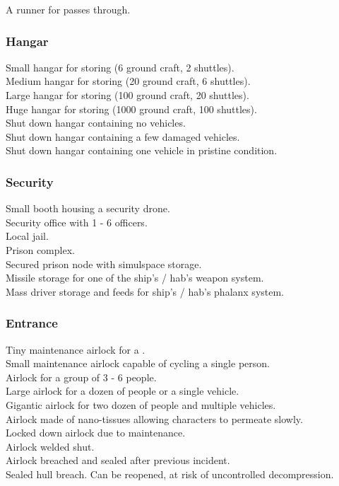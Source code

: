 \documentclass[a4]{article}
\begin{document}
\starttableone
A runner for  passes through.\\
\stoptableone


\subsubsection{Hangar}

\starttableone
Small hangar for storing (6 ground craft, 2 shuttles).\\
Medium hangar for storing (20 ground craft, 6 shuttles).\\
Large hangar for storing (100 ground craft, 20 shuttles).\\
Huge hangar for storing (1000 ground craft, 100 shuttles).\\
Shut down hangar containing no vehicles.\\
Shut down hangar containing a few damaged vehicles.\\
Shut down hangar containing one vehicle in pristine condition.\\
\stoptableone


\subsubsection{Security}

\starttableone
Small booth housing a security drone.\\
Security office with 1 - 6 officers.\\
Local jail.\\
Prison complex.\\
Secured prison node with simulspace storage.\\
Missile storage for one of the ship's / hab's weapon system.\\
Mass driver storage and feeds for ship's / hab's phalanx system.\\
\stoptableone


\subsubsection{Entrance}

\starttableone
Tiny maintenance airlock for a .\\
Small maintenance airlock capable of cycling a single person.\\
Airlock for a group of 3 - 6 people.\\
Large airlock for a dozen of people or a single vehicle.\\
Gigantic airlock for two dozen of people and multiple vehicles.\\
Airlock made of nano-tissues allowing characters to permeate slowly.\\
Locked down airlock due to maintenance.\\
Airlock welded shut.\\
Airlock breached and sealed after previous incident.\\
Sealed hull breach. Can be reopened, at risk of uncontrolled decompression.\\
\stoptableone
\end{document}
